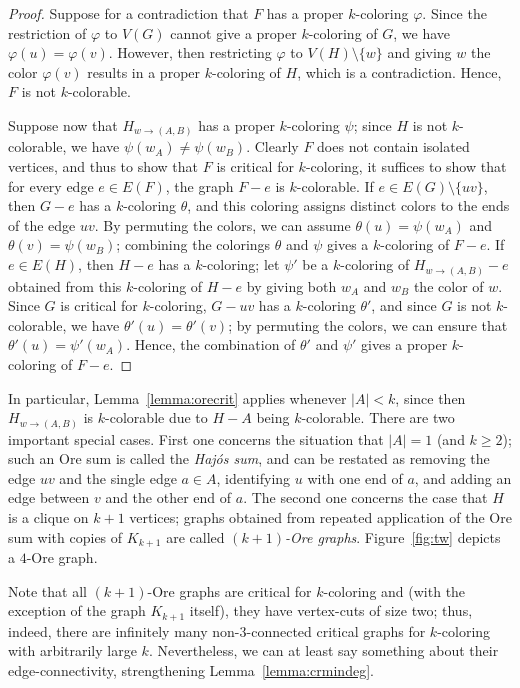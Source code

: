 \documentclass[12pt,twoside,openright,a4paper]{book}
\begin{document}
\begin{proof}
Suppose for a contradiction that $F$ has a proper $k$-coloring $\varphi$.  Since the restriction of $\varphi$ to $V(G)$ cannot give a proper $k$-coloring of $G$,
we have $\varphi(u)=\varphi(v)$.  However, then restricting $\varphi$ to $V(H)\setminus\{w\}$ and giving $w$ the color $\varphi(v)$ results in a proper $k$-coloring of $H$,
which is a contradiction.  Hence, $F$ is not $k$-colorable.

Suppose now that $H_{w\to(A,B)}$ has a proper $k$-coloring $\psi$; since $H$ is not $k$-colorable, we have $\psi(w_A)\neq\psi(w_B)$.
Clearly $F$ does not contain isolated vertices, and thus to show that $F$ is critical for $k$-coloring, it suffices to show that for every edge $e\in E(F)$, the graph $F-e$ is $k$-colorable.
If $e\in E(G)\setminus\{uv\}$, then $G-e$ has a $k$-coloring $\theta$, and this coloring assigns distinct colors to the ends of the edge $uv$.
By permuting the colors, we can assume $\theta(u)=\psi(w_A)$ and $\theta(v)=\psi(w_B)$;
combining the colorings $\theta$ and $\psi$ gives a $k$-coloring of $F-e$.  If $e\in E(H)$, then $H-e$ has a $k$-coloring; let $\psi'$ be a $k$-coloring of $H_{w\to(A,B)}-e$ obtained from this
$k$-coloring of $H-e$ by giving both $w_A$ and $w_B$ the color of $w$.  Since $G$ is critical for $k$-coloring, $G-uv$ has a $k$-coloring $\theta'$, and since $G$ is not $k$-colorable,
we have $\theta'(u)=\theta'(v)$; by permuting the colors, we can ensure that $\theta'(u)=\psi'(w_A)$.  Hence, the combination of $\theta'$ and $\psi'$ gives a proper $k$-coloring
of $F-e$.
\end{proof}
In particular, Lemma~\ref{lemma:orecrit} applies whenever $|A|<k$, since then $H_{w\to(A,B)}$ is $k$-colorable due to $H-A$ being $k$-colorable.
There are two important special cases.  First one concerns the situation that $|A|=1$ (and $k\ge 2$); such an Ore sum is called the \emph{Haj\'os sum},
and can be restated as removing the edge $uv$ and the single edge $a\in A$, identifying $u$ with one end of $a$, and adding an edge between $v$ and the other end of $a$.
The second one concerns the case that $H$ is a clique on $k+1$ vertices; graphs obtained from repeated application of the Ore sum with copies of $K_{k+1}$ are called \emph{$(k+1)$-Ore graphs}.
Figure~\ref{fig:tw} depicts a $4$-Ore graph.

Note that all $(k+1)$-Ore graphs are critical for $k$-coloring and (with the exception of the graph $K_{k+1}$ itself), they have vertex-cuts of size two; thus, indeed,
there are infinitely many non-$3$-connected critical graphs for $k$-coloring with arbitrarily large $k$.  Nevertheless, we can at least say something about their edge-connectivity,
strengthening Lemma~\ref{lemma:crmindeg}.
\end{document}
